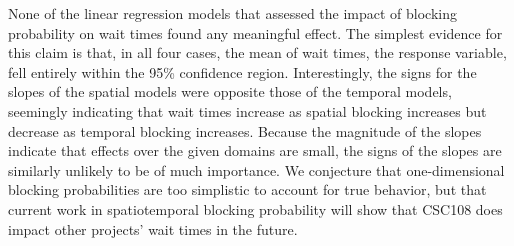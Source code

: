 None of the linear regression models that assessed the impact of blocking
probability on wait times found any meaningful effect. The simplest evidence
for this claim is that, in all four cases, the mean of wait times, the response
variable, fell entirely within the 95\% confidence region. Interestingly, the
signs for the slopes of the spatial models were opposite those of the temporal
models, seemingly indicating that wait times increase as spatial blocking
increases but decrease as temporal blocking increases. Because the magnitude of
the slopes indicate that effects over the given domains are small, the signs of
the slopes are similarly unlikely to be of much importance. We conjecture that
one-dimensional blocking probabilities are too simplistic to account for true
behavior, but that current work in spatiotemporal blocking probability will
show that CSC108 does impact other projects' wait times in the future.

